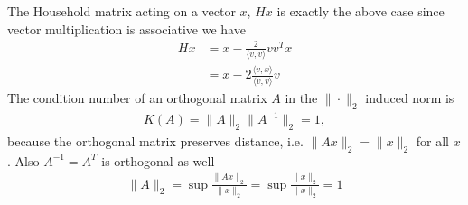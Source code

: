 The Household matrix acting on a vector $x$, $Hx$ is exactly the above case
since vector multiplication is associative we have
\begin{align}
    Hx &= x - \frac{2}{\langle v, v \rangle} vv^T x\\
       &= x - 2\frac{\langle v, x\rangle}{\langle v, v \rangle} v
\end{align}
The condition number of an orthogonal matrix $A$ in the $\|\cdot\|_2$ induced
norm is
\begin{align}
    K(A) =  \|A\|_2 \|A^{-1}\|_2 = 1,
\end{align}
because the orthogonal matrix preserves distance, i.e. $\|Ax\|_2 = \|x\|_2$
for all $x$. Also $A^{-1} =A^T$ is orthogonal as well
\begin{align}
    \|A\|_2 = \sup \frac{\|Ax\|_2}{\|x\|_2} = \sup \frac{\|x\|_2}{\|x\|_2} =
    1
\end{align}


